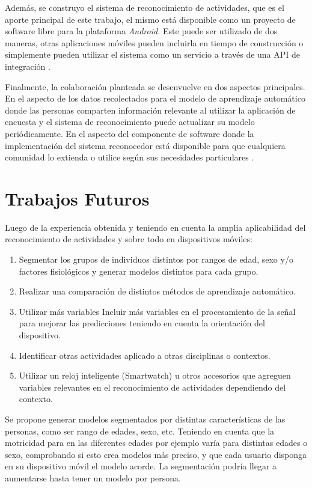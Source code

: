 Además, se construyo el sistema de reconocimiento de actividades,
que es el aporte principal de este trabajo, el mismo está disponible
como un proyecto de software libre para la plataforma \emph{Android.}
Este puede ser utilizado de dos maneras, otras aplicaciones móviles
pueden incluirla en tiempo de construcción o simplemente pueden utilizar
el sistema como un servicio a través de una API de integración \cite{hardroid2016a}.

Finalmente, la colaboración planteada se desenvuelve en dos aspectos
principales. En el aspecto de los datos recolectados para el modelo
de aprendizaje automático donde las personas comparten información
relevante al utilizar la aplicación de encuesta y el sistema de reconocimiento
puede actualizar su modelo periódicamente. En el aspecto del componente
de software donde la implementación del sistema reconocedor está disponible
para que cualquiera comunidad lo extienda o utilice según sus necesidades
particulares \cite{hardroid2016b}.

\section{Trabajos Futuros}

\label{trabajos-futuros}

Luego de la experiencia obtenida y teniendo en cuenta la amplia aplicabilidad
del reconocimiento de actividades y sobre todo en dispositivos móviles:
\begin{enumerate}
\item Segmentar los grupos de individuos distintos por rangos de edad, sexo
y/o factores fisiológicos y generar modelos distintos para cada grupo. 
\item Realizar una comparación de distintos métodos de aprendizaje automático. 
\item Utilizar más variables Incluir más variables en el procesamiento de
la señal para mejorar las predicciones teniendo en cuenta la orientación
del dispositivo. 
\item Identificar otras actividades aplicado a otras disciplinas o contextos. 
\item Utilizar un reloj inteligente (Smartwatch) u otros accesorios que
agreguen variables relevantes en el reconocimiento de actividades
dependiendo del contexto. 
\end{enumerate}
Se propone generar modelos segmentados por distintas características
de las personas, como ser rango de edades, sexo, etc. Teniendo en
cuenta que la motricidad para en las diferentes edades por ejemplo
varía para distintas edades o sexo, comprobando si esto crea modelos
más preciso, y que cada usuario disponga en su dispositivo móvil el
modelo acorde. La segmentación podría llegar a aumentarse hasta tener
un modelo por persona.

